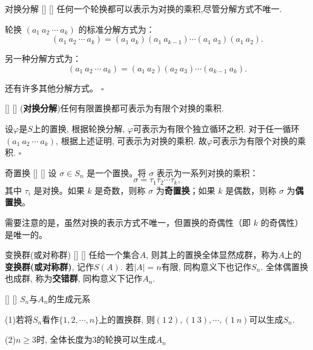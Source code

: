 \documentclass[UTF8]{ctexart}
\begin{document}
	\begin{ppt}
            []
            {对换分解}
            []
            []
		任何一个轮换都可以表示为对换的乘积,尽管分解方式不唯一.
	\end{ppt}

	\begin{prf}
		轮换 \( (a_1\ a_2\ \cdots\ a_k) \) 的标准分解方式为：
		\[
		(a_1\ a_2\ \cdots\ a_k) = (a_1\ a_k)(a_1\ a_{k-1}) \cdots (a_1\ a_3)(a_1\ a_2).
		\]

		另一种分解方式为：
		\[
		(a_1\ a_2\ \cdots\ a_k) = (a_1\ a_2)(a_2\ a_3) \cdots (a_{k-1}\ a_k).
		\]

		还有许多其他分解方式。
		$\square$

	\end{prf}

	\begin{ppt}
            []
            {}
            []
            []
		(\textbf{对换分解})任何有限置换都可表示为有限个对换的乘积.
	\end{ppt}

	\begin{prf}
		设$\varphi$是$S$上的置换, 根据轮换分解, $\varphi$可表示为有限个独立循环之积. 
		对于任一循环$(a_1\ a_2\ \cdots\ a_k)$, 根据上述证明, 可表示为对换的乘积. 
		故$\varphi$可表示为有限个对换的乘积. $\square$
	\end{prf}

	\begin{dfn}
            []
            {奇置换}
            []
            []
		设 \( \sigma \in S_n \) 是一个置换。将 \( \sigma \) 表示为一系列对换的乘积：
		\[
		\sigma = \tau_1 \tau_2 \cdots \tau_k,
		\]
		其中 \( \tau_i \) 是对换。如果 \( k \) 是奇数，则称 \( \sigma \) 为\textbf{奇置换}；如果 \( k \) 是偶数，则称 \( \sigma \) 为\textbf{偶置换}。

		需要注意的是，虽然对换的表示方式不唯一，但置换的奇偶性（即 \( k \) 的奇偶性）是唯一的。
	\end{dfn}

        \begin{dfn}
            []
            {变换群(或对称群)}
            []
            []
            任给一个集合$A$, 则其上的置换全体显然成群，称为$A$上的\textbf{变换群(或对称群)}, 记作$S(A)$. 若$|A|=n$有限, 同构意义下也记作$S_n$. 全体偶置换也成群, 称为\textbf{交错群}, 同构意义下记作$A_n$.
        \end{dfn}

        \begin{thm}
            []
            {}
            []
            []
            $S_n$与$A_n$的生成元系
        
            (1)若将$S_n$看作$\{1,2,\cdots,n\}$上的置换群, 则$(1\ 2),(1\ 3),\cdots ,(1\ n)$可以生成$S_n$.

            (2)$n\geq 3$时, 全体长度为3的轮换可以生成$A_n$
        \end{thm}
      
\end{document}
